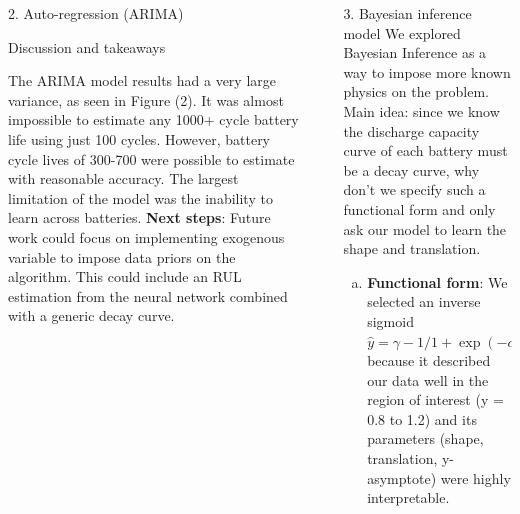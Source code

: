 \documentclass[final]{beamer}
\newlength{\sepwidth}
\newlength{\colwidth}
\newcommand{\separatorcolumn}{\begin{column}{\sepwidth}\end{column}}
\begin{document}
\begin{frame}[t]
\begin{columns}[t]
\begin{column}{\colwidth}
\begin{block}{2. Auto-regression (ARIMA)}
  \end{block}

  \begin{alertblock}{\small Discussion and takeaways}
  \begin{outline}
      \1 The ARIMA model results had a very large variance, as seen in Figure (2).
      \1  It was almost impossible to estimate any 1000+ cycle battery life using just 100 cycles. However, battery cycle lives of 300-700 were possible to estimate with reasonable accuracy.
      \1 The largest limitation of the model was the inability to learn across batteries.  
      \1 \textbf{Next steps}: Future work could focus on implementing exogenous variable to impose data priors on the algorithm. This could include an RUL estimation from the neural network combined with a generic decay curve.
  \end{outline}
     

  \end{alertblock}
\end{column}

\separatorcolumn

\begin{column}{\colwidth}

\begin{block}{3. Bayesian inference model}
    We explored Bayesian Inference as a way to impose more known physics on the problem. Main idea: since we know the discharge capacity curve of each battery must be a decay curve, why don't we specify such a functional form and only ask our model to learn the shape and translation. 

    \begin{enumerate}[(a)]%
        \item \textbf{Functional form}: We selected an inverse sigmoid $\hat{y} = \gamma - 1 / 1+\exp(-\alpha(x-\beta))$ because it described our data well in the region of interest (y = 0.8 to 1.2) and its parameters (shape, translation, y-asymptote) were highly interpretable. 
        

\end{enumerate}
\end{block}
\end{column}
\end{columns}
\end{frame}
\end{document}
